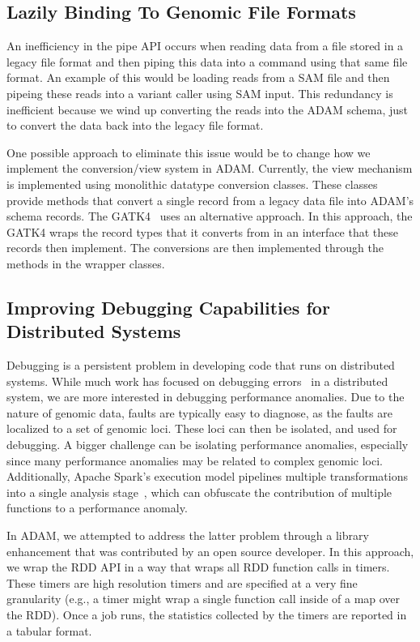 \documentclass[phd]{ucbthesis}
\begin{document}
\subsection{Lazily Binding To Genomic File Formats}
\label{sec:lazy-bind}

An inefficiency in the {pipe} API occurs when reading data from a file
stored in a legacy file format and then piping this data into a command using
that same file format. An example of this would be loading reads from a SAM file
and then {pipe}ing these reads into a variant caller using SAM input.
This redundancy is inefficient because we wind up converting the reads into the
{ADAM} schema, just to convert the data back into the legacy file format.

One possible approach to eliminate this issue would be to change how we
implement the conversion/view system in {ADAM}. Currently, the view
mechanism is implemented using monolithic datatype conversion classes. These
classes provide methods that convert a single record from a legacy data file
into {ADAM}'s schema records. The {GATK4}~\cite{gatk4} uses an
alternative approach. In this approach, the {GATK4} wraps the record
types that it converts from in an interface that these records then implement.
The conversions are then implemented through the methods in the wrapper classes.

\subsection{Improving Debugging Capabilities for Distributed Systems}
\label{sec:improving-debug}

Debugging is a persistent problem in developing code that runs on distributed
systems. While much work has focused on debugging errors~\cite{alvaro15, zhang17}
in a distributed system, we are more interested in debugging performance
anomalies. Due to the nature of genomic data, faults are typically easy to
diagnose, as the faults are localized to a set of genomic loci. These loci can
then be isolated, and used for debugging. A bigger challenge can be isolating
performance anomalies, especially since many performance anomalies may be
related to complex genomic loci. Additionally, {Apache Spark}'s execution
model pipelines multiple transformations into a single analysis
stage~\cite{zaharia12}, which can obfuscate the contribution of multiple
functions to a performance anomaly.

In {ADAM}, we attempted to address the latter problem through a library
enhancement that was contributed by an open source developer. In this approach,
we wrap the RDD API in a way that wraps all RDD function calls in timers. These
timers are high resolution timers and are specified at a very fine granularity
(e.g., a timer might wrap a single function call inside of a map over the RDD).
Once a job runs, the statistics collected by the timers are reported in a
tabular format.
\end{document}
